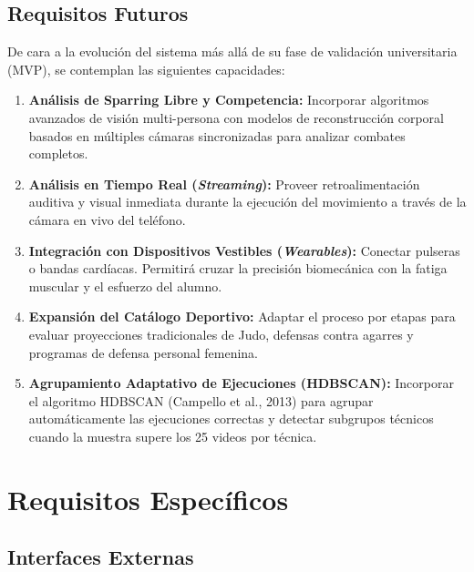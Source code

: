 \documentclass[12pt,letterpaper]{article}
\begin{document}
\subsection{Requisitos Futuros}
De cara a la evolución del sistema más allá de su fase de validación universitaria (MVP), se contemplan las siguientes capacidades:

\begin{enumerate}
    \item \textbf{Análisis de Sparring Libre y Competencia:} Incorporar algoritmos avanzados de visión multi-persona con modelos de reconstrucción corporal basados en múltiples cámaras sincronizadas para analizar combates completos.
    \item \textbf{Análisis en Tiempo Real (\textit{Streaming}):} Proveer retroalimentación auditiva y visual inmediata durante la ejecución del movimiento a través de la cámara en vivo del teléfono.
    \item \textbf{Integración con Dispositivos Vestibles (\textit{Wearables}):} Conectar pulseras o bandas cardíacas. Permitirá cruzar la precisión biomecánica con la fatiga muscular y el esfuerzo del alumno.
    \item \textbf{Expansión del Catálogo Deportivo:} Adaptar el proceso por etapas para evaluar proyecciones tradicionales de Judo, defensas contra agarres y programas de defensa personal femenina.
    \item \textbf{Agrupamiento Adaptativo de Ejecuciones (HDBSCAN):} Incorporar el algoritmo HDBSCAN (Campello et al., 2013) para agrupar automáticamente las ejecuciones correctas y detectar subgrupos técnicos cuando la muestra supere los 25 videos por técnica.
\end{enumerate}

\section{Requisitos Específicos}

\subsection{Interfaces Externas}
\end{document}
